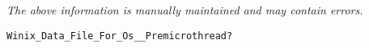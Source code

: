 \label{pkg:data\_file\_\_premicrothread}

{\tiny \it The above information is manually maintained and may contain errors.}
\begin{verbatim}
Winix_Data_File_For_Os__Premicrothread?
\end{verbatim}

